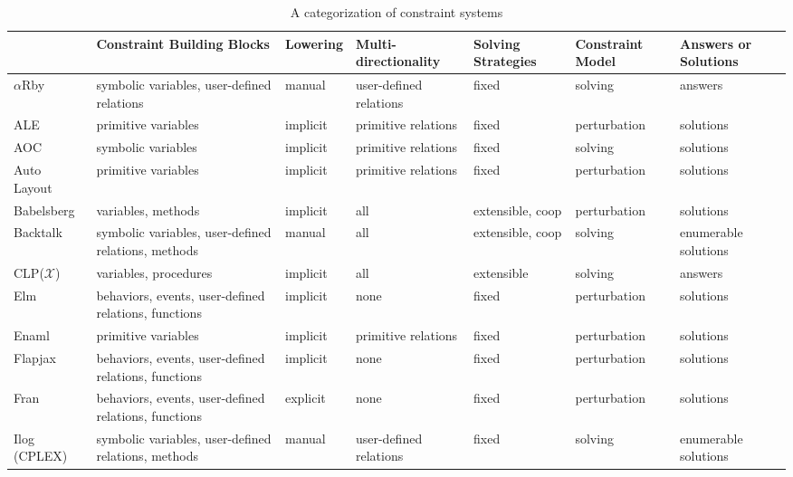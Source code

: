 \begin{table}
  \centering
  \tableinsidecommand
  \caption{A categorization of constraint systems}
  \label{tab:categorization}
  \begin{threeparttable}
    \begin{tabular}{lllllll}
      \toprule
    & Constraint Building Blocks & Lowering & Multi-directionality & Solving Strategies & Constraint Model & Answers or Solutions %
     \\ 
    \midrule
    $\alpha$Rby & symbolic variables, user-defined relations & manual & user-defined relations & fixed & solving & answers %
     \\ 
    ALE & primitive variables & implicit & primitive relations & fixed & perturbation\tnote{1} & solutions %
     \\ 
    AOC & symbolic variables & implicit & primitive relations & fixed & solving & solutions %
     \\ 
    Auto Layout & primitive variables & implicit & primitive relations & fixed & perturbation\tnote{1} & solutions %
     \\ 
    Babelsberg & variables, methods & implicit & all\tnote{5} & extensible, coop & perturbation\tnote{1} & solutions %
     \\ 
    Backtalk & symbolic variables, user-defined relations, methods & manual & all & extensible, coop & solving & enumerable solutions %
     \\ 
    CLP($\mathcal{X}$) & variables, procedures & implicit & all & extensible & solving & answers %
     \\ 
    Elm & behaviors, events, user-defined relations, functions & implicit & none & fixed & perturbation\tnote{2} & solutions %
     \\ 
    Enaml & primitive variables & implicit & primitive relations & fixed & perturbation\tnote{1} & solutions %
     \\ 
    Flapjax & behaviors, events, user-defined relations, functions & implicit & none & fixed & perturbation\tnote{2} & solutions %
     \\ 
    Fran & behaviors, events, user-defined relations, functions & explicit & none & fixed & perturbation\tnote{3} & solutions %
     \\ 
    Ilog (CPLEX) & symbolic variables, user-defined relations, methods & manual & user-defined relations & fixed & solving & enumerable solutions %

\end{tabular}
\end{threeparttable}
\end{table}
